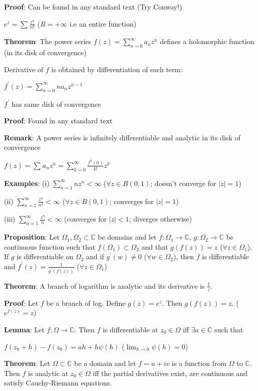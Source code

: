 \documentclass{article}
\begin{document}
\begin{flushleft}
\textbf{Proof}: Can be found in any standard text (Try Conway!)

$e^z=\sum_{}^{}\frac{z^n}{n!}$ ($R=+\infty$ i.e an entire function)

\textbf{Theorem}: The power series $f(z)=\sum_{n=0}^{\infty} a_nz^n$ defines a holomorphic function (in its disk of convergence)

Derivative of $f$ is obtained by differentiation of each term:

$f^{'}(z)=\sum_{n=0}^{\infty} na_nz^{n-1}$ 

$f^{'}$ has same disk of convergence

\textbf{Proof}: Found in any standard text

\textbf{Remark}: A power series is infinitely differentiable and analytic in its disk of convergence

$f(z)=\sum_{}^{}a_nz^n =\sum_{k=0}^{\infty} \frac{f^{k}(0)}{k!} z^k$

\textbf{Examples}: (i) $\sum_{n=1}^{\infty} nz^n <\infty$ ($\forall z \in B(0,1)$; doesn't converge for $|z|=1$) 

(ii) $\sum_{n=1}^{\infty} \frac{z^n}{n^2} <\infty$ ($\forall z\in B(0,1)$; converges for $|z|=1$)

(iii) $\sum_{n=1}^{\infty} \frac{z^n}{n} <\infty$ (converges for $|z|<1$; diverges otherwise)

\textbf{Proposition}: Let $\Omega_1,\Omega_2 \subset \mathds{C}$ be domains and let $f:\Omega_1\rightarrow \mathds{C}$,
$g:\Omega_2\rightarrow \mathds{C}$ be continuous function such that $f(\Omega_1)\subset \Omega_2$ and that $g(f(z))=z$ ($\forall z\in \Omega_1$).
If $g$ is differentiable on $\Omega_2$ and if $g^{'}(w)\neq 0$ ($\forall w \in \Omega_2$), then $f$ is differentiable and $f^{'}(z)=\frac{1}{g^{'}(f(z))}$ ($\forall z\in \Omega_1$)

\textbf{Theorem}: A branch of logarithm is analytic and its derivative is $\frac{1}{z}$.

\textbf{Proof}: Let $f$ be a branch of log. Define $g(z)=e^z$. Then $g(f(z))=z$. ($e^{f(z)}=z$)

\textbf{Lemma}: Let $f:\Omega \rightarrow \mathds{C}$. Then $f$ is differentiable at $z_0\in \Omega$ iff $\exists a\in \mathds{C}$ such that 

$f(z_0+h)-f(z_0)= ah+h\psi(h)$ ($\lim_{h \to 0} \psi(h)=0$)

\textbf{Theorem}: Let $\Omega \subset \mathds{C}$ be a domain and let $f=u+iv$ is a function from $\Omega$ to $\mathds{C}$.
Then $f$ is analytic at $z_0\in \Omega$ iff the partial derivatives exist, are continuous and satisfy Cauchy-Riemann equations.


\end{flushleft}
\end{document}
